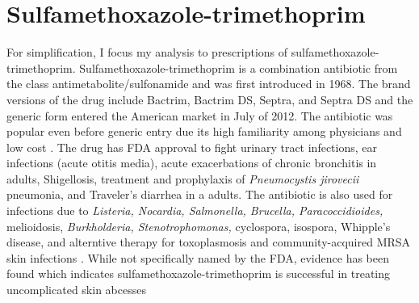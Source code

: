\section{Sulfamethoxazole-trimethoprim}
\indent For simplification, I focus my analysis to prescriptions of sulfamethoxazole-trimethoprim. Sulfamethoxazole-trimethoprim is a combination antibiotic from the class antimetabolite/sulfonamide and was first introduced in 1968. The brand versions of the drug include Bactrim, Bactrim DS, Septra, and Septra DS and the generic form entered the American market in July of 2012. The antibiotic was popular even before generic entry due its high familiarity among physicians and low cost \cite{noauthor_sulfamethoxazole_nodate,ho_considerations_2011}. The drug has FDA approval to fight urinary tract infections, ear infections (acute otitis media), acute exacerbations of chronic bronchitis in adults, Shigellosis, treatment and prophylaxis of \textit{Pneumocystis jirovecii} pneumonia, and Traveler's diarrhea in a adults. The antibiotic is also used for infections due to \textit{Listeria, Nocardia, Salmonella, Brucella, Paracoccidioides,} melioidosis, \textit{Burkholderia, Stenotrophomonas,} cyclospora, isospora, Whipple's disease, and alterntive therapy for toxoplasmosis and community-acquired MRSA skin infections \cite{schlossberg_antibiotics_2017}. While not specifically named by the FDA, evidence has been found which indicates sulfamethoxazole-trimethoprim is successful in treating uncomplicated skin abcesses \cite{noauthor_trimethoprimsulfamethoxazole_nodate}\\

